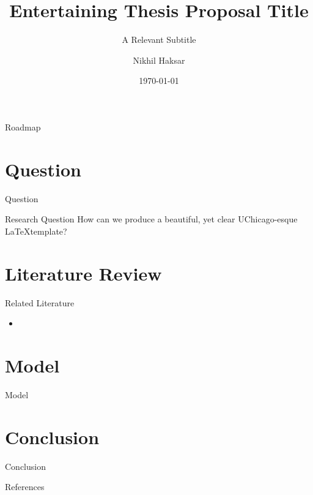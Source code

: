 \documentclass[notes,aspectratio=169]{beamer}       %
\title{Entertaining Thesis Proposal Title}
\subtitle{A Relevant Subtitle}
\author{Nikhil Haksar}
\institute[UChicago]{The University of Chicago}
\date{\today}
\begin{document}
\begin{frame}
\titlepage
\end{frame}
\begin{frame}{Roadmap}
    \tableofcontents
\end{frame}
\section{Question}
\begin{frame}{Question}
    \begin{block}{Research Question}
    How can we produce a beautiful, yet clear UChicago-esque \LaTeX template?
    \end{block}
\end{frame}

\section{Literature Review}
\begin{frame}{Related Literature}
    \begin{itemize}
        \item 
    \end{itemize}
\end{frame}

\section{Model}
\begin{frame}{Model}
\end{frame}

\section{Conclusion}
\begin{frame}{Conclusion}
    
\end{frame}

\begin{frame}{References} %
	\tiny                     %
    
\end{frame}
\end{document}
